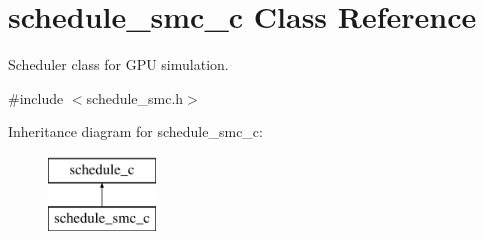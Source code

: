 \hypertarget{classschedule__smc__c}{
\section{schedule\_\-smc\_\-c Class Reference}
\label{classschedule__smc__c}
}


Scheduler class for GPU simulation.  




{\ttfamily \#include $<$schedule\_\-smc.h$>$}

Inheritance diagram for schedule\_\-smc\_\-c:\begin{figure}[H]
\begin{center}
\leavevmode
\includegraphics[height=2.000000cm]{classschedule__smc__c}
\end{center}
\end{figure}
